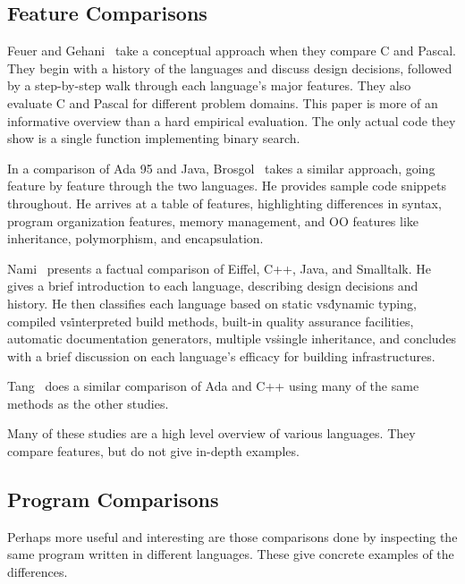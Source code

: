 \documentclass{article}
\begin{document}
\subsection{Feature Comparisons}

Feuer and Gehani~\cite{FeuerCVsPascal} take a conceptual approach when they compare C and
Pascal.  They begin with a history of the languages and
discuss design decisions, followed by a step-by-step walk through each
language's major features.  They also evaluate C and Pascal for different
problem domains.  This paper is more of an informative overview than a hard
empirical evaluation.  The only actual code they show is a single function
implementing binary search.

In a comparison of Ada 95 and Java, Brosgol~\cite{BrosgolCompOOAdaVsJava} takes
a similar approach, going feature by feature through the two languages.  He
provides sample code snippets throughout.  He arrives at a table of features,
highlighting differences in syntax, program organization features, memory
management, and OO features like inheritance, polymorphism, and encapsulation.

Nami~\cite{NamiCompOOSoftEng} presents a factual comparison of Eiffel, C++, Java, and
Smalltalk.  He gives a brief introduction to each
language, describing design decisions and history.  He then classifies each
language based on static vs\. dynamic typing, compiled vs\. interpreted build
methods, built-in quality assurance facilities, automatic documentation
generators, multiple vs\. single inheritance, and concludes with a brief
discussion on each language's efficacy for building infrastructures.

Tang~\cite{TangAdaVsCpp} does a similar comparison of Ada and C++ using many of
the same methods as the other studies.

Many of these studies are a high level overview of various languages.  They
compare features, but do not give in-depth examples.

\subsection{Program Comparisons}

Perhaps more useful and interesting are those comparisons done by inspecting
the same program written in different languages.  These give concrete examples
of the differences.
\end{document}
